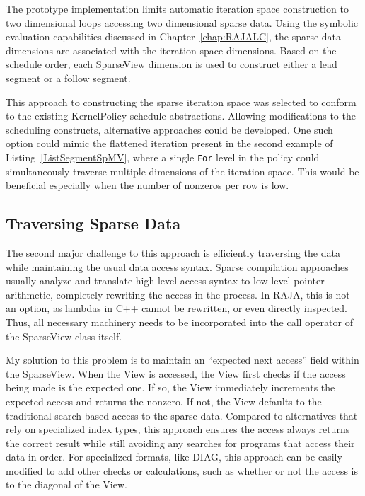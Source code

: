 The prototype implementation limits automatic iteration space construction to two dimensional loops accessing two dimensional sparse data.
Using the symbolic evaluation capabilities discussed in Chapter~\ref{chap:RAJALC}, the sparse data dimensions are associated with the iteration space dimensions.
Based on the schedule order, each SparseView dimension is used to construct either a lead segment or a follow segment.

This approach to constructing the sparse iteration space was selected to conform to the existing KernelPolicy schedule abstractions.
Allowing modifications to the scheduling constructs, alternative approaches could be developed.
One such option could mimic the flattened iteration present in the second example of Listing~\ref{ListSegmentSpMV}, where a single \verb.For. level in the policy could simultaneously traverse multiple dimensions of the iteration space.
This would be beneficial especially when the number of nonzeros per row is low.

\subsection{Traversing Sparse Data}

The second major challenge to this approach is efficiently traversing the data while maintaining the usual data access syntax.
Sparse compilation approaches usually analyze and translate high-level access syntax to low level pointer arithmetic, completely rewriting the access in the process.
In RAJA, this is not an option, as lambdas in C++ cannot be rewritten, or even directly inspected.
Thus, all necessary machinery needs to be incorporated into the call operator of the SparseView class itself.

My solution to this problem is to maintain an ``expected next access'' field within the SparseView. 
When the View is accessed, the View first checks if the access being made is the expected one. 
If so, the View immediately increments the expected access and returns the nonzero.
If not, the View defaults to the traditional search-based access to the sparse data.
Compared to alternatives that rely on specialized index types, this approach ensures the access always returns the correct result while still avoiding any searches for programs that access their data in order.
For specialized formats, like DIAG, this approach can be easily modified to add other checks or calculations, such as whether or not the access is to the diagonal of the View.




